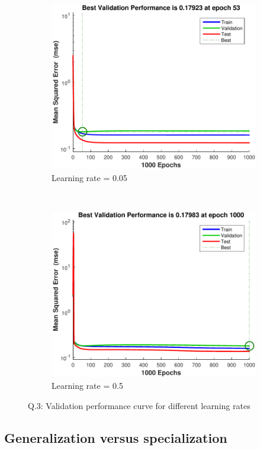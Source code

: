 \documentclass[12pt, a4paper]{article}
\begin{document}
\begin{figure}[htbp]
\begin{subfigure}[b]{0.48\textwidth}
			\includegraphics[width=\textwidth]{Q3-05}
			\caption{Learning rate = 0.05}
			\label{Q3.05}			
		\end{subfigure}
		~
		\begin{subfigure}[b]{0.48\textwidth}
			\includegraphics[width=\textwidth]{Q3-5}
			\caption{Learning rate = 0.5}
			\label{Q3.5}			
		\end{subfigure}
\caption{Q.3: Validation performance curve for different learning rates}
\label{Q3}
\end{figure}

\subsection*{Generalization versus specialization}
\setcounter{subsubsection}{3}
\end{document}
